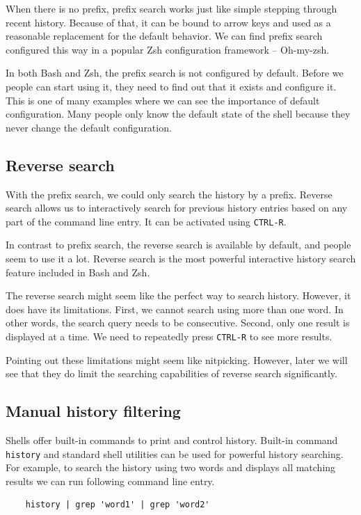 When there is no prefix, prefix search works just like simple stepping through recent history. Because of that, it can be bound to arrow keys and used as a reasonable replacement for the default behavior. We can find prefix search configured this way in a popular Zsh configuration framework -- Oh-my-zsh\cite{toolsohmyzsh}.

In both Bash and Zsh, the prefix search is not configured by default. Before we people can start using it, they need to find out that it exists and configure it. This is one of many examples where we can see the importance of default configuration. Many people only know the default state of the shell because they never change the default configuration.

\subsection{Reverse search}

With the prefix search, we could only search the history by a prefix.
Reverse search allows us to interactively search for previous history entries based on any part of the command line entry. It can be activated using \verb|CTRL-R|.

In contrast to prefix search, the reverse search is available by default, and people seem to use it a lot. Reverse search is the most powerful interactive history search feature included in Bash and Zsh.

The reverse search might seem like the perfect way to search history. However, it does have its limitations. First, we cannot search using more than one word. In other words, the search query needs to be consecutive. Second, only one result is displayed at a time. We need to repeatedly press \verb|CTRL-R| to see more results.

Pointing out these limitations might seem like nitpicking. However, later we will see that they do limit the searching capabilities of reverse search significantly.


\subsection{Manual history filtering}

Shells offer built-in commands to print and control history. Built-in command \verb|history| and standard shell utilities can be used for powerful history searching.
For example, to search the history using two words and displays all matching results we can run following command line entry. 
\begin{verbatim}
    history | grep 'word1' | grep 'word2'
\end{verbatim}

